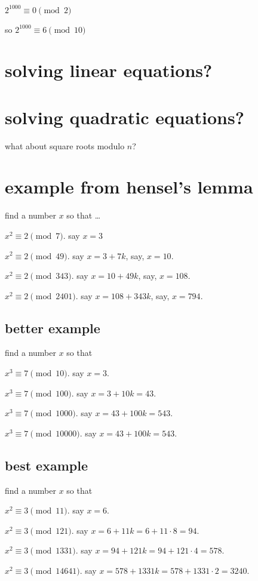\documentclass[12pt]{handout}
\begin{document}
$2^{1000} \equiv 0 \pmod 2$

so $2^{1000} \equiv 6 \pmod{10}$

\section*{solving linear equations?}

\section*{solving quadratic equations?}

what about square roots modulo $n$?

\section*{example from hensel's lemma}

find a number $x$ so that \ldots

$x^2 \equiv 2 \pmod{7}$.  say $x = 3$

$x^2 \equiv 2 \pmod{49}$.  say $x = 3 + 7k$, say, $x = 10$.

$x^2 \equiv 2 \pmod{343}$.  say $x = 10 + 49k$, say, $x = 108$.

$x^2 \equiv 2 \pmod{2401}$.  say $x = 108 + 343k$, say, $x = 794$.

\subsection*{better example}

find a number $x$ so that

$x^3 \equiv 7 \pmod{10}$.  say $x = 3$.

$x^3 \equiv 7 \pmod{100}$.  say $x = 3 + 10k = 43$.

$x^3 \equiv 7 \pmod{1000}$.  say $x = 43 + 100k = 543$.

$x^3 \equiv 7 \pmod{10000}$.  say $x = 43 + 100k = 543$.

\subsection*{best example}

find a number $x$ so that

$x^2 \equiv 3 \pmod{11}$.  say $x = 6$.

$x^2 \equiv 3 \pmod{121}$.  say $x = 6 + 11k = 6 + 11\cdot 8 = 94$.

$x^2 \equiv 3 \pmod{1331}$.  say $x = 94 + 121k = 94 + 121 \cdot 4 = 578$.

$x^2 \equiv 3 \pmod{14641}$.  say $x = 578 + 1331k = 578 + 1331 \cdot 2 = 3240$.
\end{document}
